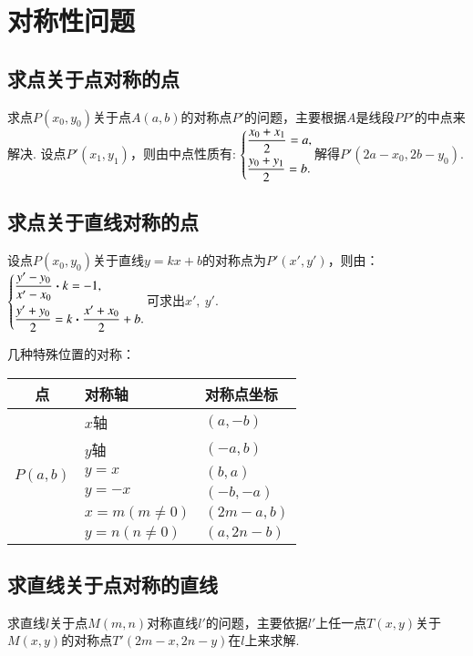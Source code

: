 \documentclass{BHCexam}
\begin{document}
\section{对称性问题}
\subsection{求点关于点对称的点}
求点$ P(x_0,y_0) $关于点$ A(a,b) $的对称点$ P' $的问题，主要根据$ A $是线段$ PP' $的中点来解决.
设点$ P'(x_1,y_1) $，则由中点性质有:
$\begin{dcases}
\dfrac{x_0+x_1}{2}=a,\\
\dfrac{y_0+y_1}{2}=b.
\end{dcases}$解得$ P'(2a-x_0,2b-y_0) $.
\subsection{求点关于直线对称的点}
设点$ P(x_0,y_0) $关于直线$ y=kx+b $的对称点为$ P'(x',y') $，则由：
$\begin{dcases}
\dfrac{y'-y_0}{x'-x_0}\bm{\cdot}k=-1,\\
\dfrac{y'+y_0}{2}=k\bm{\cdot}\dfrac{x'+x_0}{2}+b.
\end{dcases}
$可求出$ x',\ y' $.\par
几种特殊位置的对称：
\begin{center}
\begin{tabular}{c|p{3cm}<{\centering}|p{3cm}<{\centering}}
\hline 
\rowcolor[rgb]{.8,.9,.9}
\textbf{点}&\textbf{对称轴}&\textbf{对称点坐标}\\
\hline 
\multirow{6}{*}{$P(a,b)$}&$x$轴&$(a,-b)$\\
\cline{2-3}
&$y$轴&$(-a,b)$\\
\cline{2-3}
&$y=x$&$(b,a)$\\
\cline{2-3}
&$y=-x$&$(-b,-a)$\\
\cline{2-3}
&$x=m(m\ne0)$&$(2m-a,b)$\\
\cline{2-3}
&$y=n(n\ne0)$&$(a,2n-b)$\\
\hline 
\end{tabular}
\end{center}

\subsection{求直线关于点对称的直线}
求直线$ l $关于点$ M(m,n) $对称直线$ l' $的问题，主要依据$ l' $上任一点$ T(x,y) $关于$ M(x,y) $的对称点$ T'(2m-x,2n-y) $在$ l $上来求解.
\end{document}
